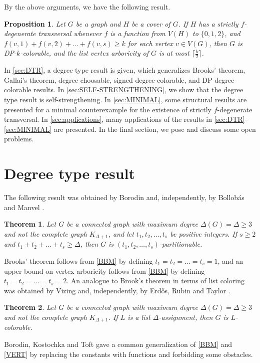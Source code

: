 \documentclass{article}
\newtheorem{theorem}{Theorem}[section]
\newtheorem{proposition}{Proposition}
\theoremstyle{definition}
\begin{document}
By the above arguments, we have the following result. 

\begin{proposition}
Let $G$ be a graph and $H$ be a cover of $G$. If $H$ has a strictly $f$-degenerate transversal whenever $f$ is a function from $V(H)$ to $\{0, 1, 2\}$, and $f(v, 1) + f(v, 2) + \dots + f(v, s) \geq k$ for each vertex $v \in V(G)$, then $G$ is DP-$k$-colorable, and the list vertex arboricity of $G$ is at most $\lceil\frac{k}{2}\rceil$. 
\end{proposition}

In \autoref{sec:DTR}, a degree type result is given, which generalizes Brooks' theorem, Gallai's theorem, degree-choosable, signed degree-colorable, and DP-degree-colorable results. In \autoref{sec:SELF-STRENGTHENING}, we show that the degree type result is self-strengthening. In \autoref{sec:MINIMAL}, some structural results are presented for a minimal counterexample for the existence of strictly $f$-degenerate transversal. In \autoref{sec:applications}, many applications of the results in \autoref{sec:DTR}--\ref{sec:MINIMAL} are presented. In the final section, we pose and discuss some open problems. 
\section{Degree type result}\label{sec:DTR}
The following result was obtained by Borodin \cite{MR0498204} and, independently, by Bollob\'{a}s and Manvel \cite{MR541961}. 
\begin{theorem}\label{BBM}
Let $G$ be a connected graph with maximum degree $\Delta(G) = \Delta \geq 3$ and not the complete graph $K_{\Delta + 1}$, and let $t_{1}, t_{2}, \dots, t_{s}$ be positive integers. If $s \geq 2$ and $t_{1} + t_{2} + \dots + t_{s} \geq \Delta$, then $G$ is $(t_{1}, t_{2}, \dots, t_{s})$-partitionable. 
\end{theorem}

Brooks' theorem follows from \autoref{BBM} by defining $t_{1} = t_{2} = \dots = t_{s} = 1$, and an upper bound on vertex arboricity follows from \autoref{BBM} by defining $t_{1} = t_{2} = \dots = t_{s} = 2$. An analogue to Brook's theorem in terms of list coloring was obtained by Vizing \cite{MR0498216} and, independently, by Erd\H{o}s, Rubin and Taylor \cite{MR593902}. 
\begin{theorem}\label{VERT}
Let $G$ be a connected graph with maximum degree $\Delta(G) = \Delta \geq 3$ and not the complete graph $K_{\Delta + 1}$. If $L$ is a list $\Delta$-assignment, then $G$ is $L$-colorable. 
\end{theorem}
Borodin, Kostochka and Toft \cite{MR1743629} gave a common generalization of \autoref{BBM} and \autoref{VERT} by replacing the constants with functions and forbidding some obstacles.  
\end{document}
